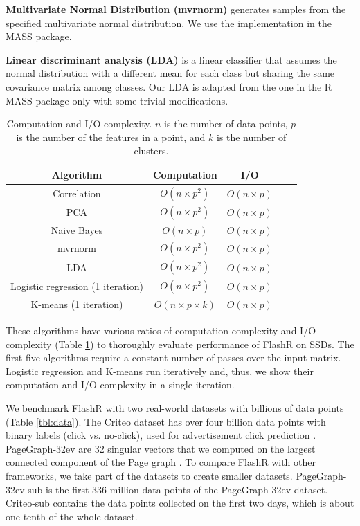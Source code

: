 \noindent \textbf{Multivariate Normal Distribution (mvrnorm)} generates
samples from the specified multivariate normal distribution. We use
the implementation in the MASS package.

\noindent \textbf{Linear discriminant analysis (LDA)} is a linear classifier
that assumes the normal distribution with a different mean for each class
but sharing the same covariance matrix among classes. Our LDA is adapted from
the one in the R MASS package only with some trivial modifications.

\begin{table}
\begin{center}
\caption{Computation and I/O complexity. $n$ is the number of data points, $p$
is the number of the features in a point, and $k$ is the number of clusters.
}
\vspace{-10pt}
\footnotesize
\begin{tabular}{|c|c|c|c|c|}
\hline
Algorithm & Computation & I/O \\
\hline
Correlation & $O(n \times p^2)$ & $O(n \times p)$ \\
\hline
PCA & $O(n \times p^2)$ & $O(n \times p)$ \\
\hline
Naive Bayes & $O(n \times p)$ & $O(n \times p)$ \\
\hline
mvrnorm & $O(n \times p^2)$ & $O(n \times p)$ \\
\hline
LDA & $O(n \times p^2)$ & $O(n \times p)$ \\
\hline
Logistic regression  (1 iteration) & $O(n \times p^2)$ & $O(n \times p)$ \\
\hline
K-means (1 iteration) & $O(n \times p \times k)$ & $O(n \times p)$ \\
\hline
\end{tabular}
\normalsize
\label{tbl:algs}
\end{center}
\end{table}

These algorithms have various ratios of computation complexity and I/O complexity
(Table \ref{tbl:algs}) to thoroughly evaluate performance of FlashR on SSDs.
The first five algorithms require a constant number of passes over the input
matrix. Logistic regression and K-means run iteratively and, thus, we show
their computation and I/O complexity in a single iteration.

We benchmark FlashR with two real-world datasets with billions of data points
(Table \ref{tbl:data}). The Criteo dataset has over four billion data points
with binary labels (click vs. no-click), used for advertisement click
prediction \cite{criteo}. PageGraph-32ev are 32 singular vectors that we
computed on the largest connected component of the Page graph \cite{webgraph}.
To compare FlashR with other frameworks, we take part of the datasets to
create smaller datasets. PageGraph-32ev-sub is the first 336 million data points
of the PageGraph-32ev dataset. Criteo-sub contains the data points collected
on the first two days, which is about one tenth of the whole dataset.

